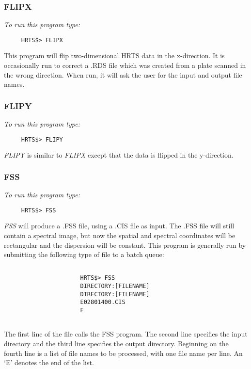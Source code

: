 \subsubsection{FLIPX}

{\em To run this program type:}
\begin{verbatim}
     HRTS$> FLIPX
\end{verbatim}
This program will flip two-dimensional HRTS data in the x-direction.
It is occasionally run to correct a .RDS file which was created from a plate
scanned in the wrong direction. When run, it will ask the user for the input
and output file names.

\subsubsection{FLIPY}

{\em To run this program type:}
\begin{verbatim}
     HRTS$> FLIPY
\end{verbatim}
{\em FLIPY} is similar to {\em FLIPX} except that the data is flipped in the 
y-direction.

\subsubsection{FSS}

{\em To run this program type:}
\begin{verbatim}   
     HRTS$> FSS             
\end{verbatim}
{\em FSS} will produce a .FSS file, using a .CIS file as input.  The .FSS
   file will still contain a spectral image, but now the spatial and
   spectral coordinates will be rectangular and the dispersion will be
   constant.  This program is generally run by submitting the following
   type of file to a batch queue:
\begin{verbatim}   
                    
                      HRTS$> FSS                    
                      DIRECTORY:[FILENAME] 
                      DIRECTORY:[FILENAME]  
                      E02801400.CIS            
                      E                        
                    
\end{verbatim}   

      The first line of the file calls the FSS program.  The second
   line specifies the input directory and the third line specifies the
   output directory.  Beginning on the fourth line is a list of file names
   to be processed, with one file name per line.  An `E' denotes the end
   of the list.


